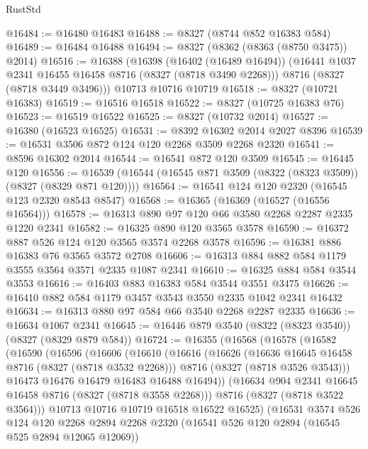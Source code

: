 \begin{lexlean}{RustStd}
\begin{coremodule}
{\begin{coremodule}
{{{{{{{{{{{{{{{{{{{{{{{{{{{{{{{{{{{{{{{{{{{{{{{{{{{{{{@16484 := @16480 @16483
@16488 := @8327 (@8744 @852 @16383 @584)
@16489 := @16484 @16488
@16494 := @8327 (@8362 (@8363 (@8750 @3475)) @2014)
@16516 := @16388
    (@16398
      (@16402 (@16489 @16494))
      (@16441 @1037 @2341 @16455 @16458 @8716 (@8327 (@8718 @3490 @2268)))
      @8716
      (@8327 (@8718 @3449 @3496)))
    @10713
    @10716
    @10719
@16518 := @8327 (@10721 @16383)
@16519 := @16516 @16518
@16522 := @8327 (@10725 @16383 @76)
@16523 := @16519 @16522
@16525 := @8327 (@10732 @2014)
@16527 := @16380 (@16523 @16525)
@16531 := @8392 @16302 @2014 @2027 @8396
@16539 := @16531 @3506 @872 @124 @120 @2268 @3509 @2268 @2320
@16541 := @8596 @16302 @2014
@16544 := @16541 @872 @120 @3509
@16545 := @16445 @120
@16556 := @16539 (@16544 (@16545 @871 @3509 (@8322 (@8323 @3509)) (@8327 (@8329 @871 @120))))
@16564 := @16541 @124 @120 @2320 (@16545 @123 @2320 @8543 @8547)
@16568 := @16365 (@16369 (@16527 (@16556 @16564)))
@16578 := @16313 @890 @97 @120 @66 @3580 @2268 @2287 @2335 @1220 @2341
@16582 := @16325 @890 @120 @3565 @3578
@16590 := @16372 @887 @526 @124 @120 @3565 @3574 @2268 @3578
@16596 := @16381 @886 @16383 @76 @3565 @3572 @2708
@16606 := @16313 @884 @882 @584 @1179 @3555 @3564 @3571 @2335 @1087 @2341
@16610 := @16325 @884 @584 @3544 @3553
@16616 := @16403 @883 @16383 @584 @3544 @3551 @3475
@16626 := @16410 @882 @584 @1179 @3457 @3543 @3550 @2335 @1042 @2341 @16432
@16634 := @16313 @880 @97 @584 @66 @3540 @2268 @2287 @2335
@16636 := @16634 @1067 @2341
@16645 := @16446 @879 @3540 (@8322 (@8323 @3540)) (@8327 (@8329 @879 @584))
@16724 := @16355
    (@16568
      (@16578
        (@16582
          (@16590
            (@16596
              (@16606
                (@16610
                  (@16616
                    (@16626
                      (@16636 @16645 @16458 @8716 (@8327 (@8718 @3532 @2268)))
                      @8716
                      (@8327 (@8718 @3526 @3543)))
                    @16473
                    @16476
                    @16479
                    @16483
                    @16488
                    @16494))
                (@16634 @904 @2341 @16645 @16458 @8716 (@8327 (@8718 @3558 @2268)))
                @8716
                (@8327 (@8718 @3522 @3564)))
              @10713
              @10716
              @10719
              @16518
              @16522
              @16525)
            (@16531
              @3574
              @526
              @124
              @120
              @2268
              @2894
              @2268
              @2320
              (@16541 @526 @120 @2894 (@16545 @525 @2894 @12065 @12069))
}}}}}}}}}}}}}}}}}}}}}}}}}}}}}}}}}}}}}}}}}}}}}}}}}}}}}}
\end{coremodule}}
\end{coremodule}
\end{lexlean}
